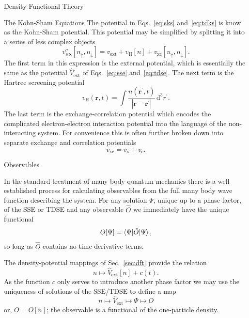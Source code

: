 \documentclass[letterpaper, 11 pt]{report}
\begin{document}
\begin{chapter}{Density Functional Theory \label{chap:dft}}
\begin{section}{The Kohn-Sham Equations \label{sec:ks}}
      The potential in Eqs.~\eqref{eq:sks} and~\eqref{eq:tdks} is know as the Kohn-Sham potential. This
      potential may be simplified by splitting it into a series of less complex objects
      \begin{equation} \label{eq:vks}
         v^\sigma_\mathrm{KS}[n_\uparrow, n_\downarrow] = v_\mathrm{ext} + v_\mathrm{H}[n]
            + v_\mathrm{xc}[n_\uparrow, n_\downarrow].
      \end{equation}
      The first term in this expression is the external potential, which is essentially the same as the
      potential $\hat{V}_\mathrm{ext}$ of Eqs.~\eqref{eq:sse} and~\eqref{eq:tdse}. The next term is
      the Hartree screening potential
      \begin{equation} \label{eq:vh}
         v_\mathrm{H}(\mathbf{r},t) = \int \frac{n(\mathbf{r}^\prime, t)}
            {\left| \mathbf{r} - \mathbf{r}^\prime\right|} \, \mathrm{d}^3 r^\prime.
      \end{equation}
      The last term is the exchange-correlation potential which encodes the complicated
      electron-electron interaction potential into the language of the non-interacting system. For
      convenience this is often further broken down into separate exchange and correlation potentials
      \begin{equation} \label{eq:vxc}
         v_\mathrm{xc} = v_\mathrm{x} + v_\mathrm{c}.
      \end{equation}

   \end{section}

   \begin{section}{Observables \label{sec:obs}}

      In the standard treatment of many body quantum mechanics there is a well established process for
      calculating observables from the full many body wave function describing the system. For any
      solution $\Psi$, unique up to a phase factor, of the SSE or TDSE and any observable $\hat{O}$ we
      immediately have the unique functional
      \begin{equation} \label{eq:obsfunc1}
         O[\Psi] = \braket{\Psi| \hat{O} | \Psi},
      \end{equation}
      so long as $\hat{O}$ contains no time derivative terms.

      The density-potential mappings of Sec.~\ref{sec:dft} provide the relation
      \begin{equation} \label{eq:denpot}
         n \mapsto \hat{V}_\mathrm{ext}[n] + c(t).
      \end{equation}
      As the function $c$ only serves to introduce another phase factor we may use the uniqueness of
      solutions of the SSE/TDSE to define a map
      \begin{equation} \label{eq:obsfunc2}
         n \mapsto \hat{V}_\mathrm{ext} \mapsto \Psi \mapsto O
      \end{equation}
      or, $O = O[n]$; the observable is a functional of the one-particle density.


\end{section}
\end{chapter}
\end{document}
